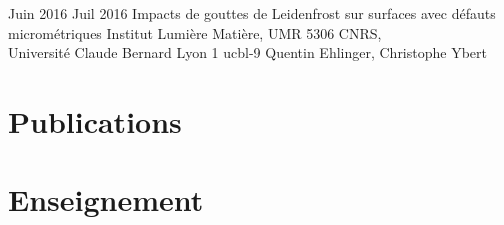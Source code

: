 \documentclass[letterpaper]{cvtemplate_fr} %
\begin{document}
\begin{cvbody}
\cvitem
	{Juin 2016}
	{Juil 2016}
	{Impacts de gouttes de Leidenfrost sur surfaces avec d\'efauts microm\'etriques}
	{Institut Lumi\`ere Mati\`ere, UMR 5306 CNRS,\\
	Universit\'e Claude Bernard Lyon 1 }
	{ucbl}{}{-9}
	{Quentin Ehlinger, Christophe Ybert}
	{\\
	}

\end{cvbody}


\section{Publications}

\begin{cvbody}

\parbox[t]{\textwidth}{

\begin{refsection}
\nocite{*}
\setlength\bibitemsep{-5pt}
\printbibliography[heading=empty]
\end{refsection}

}

\end{cvbody}


\section{Enseignement}
\end{document}
